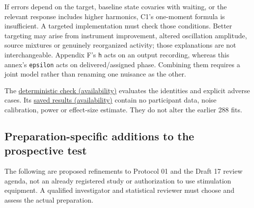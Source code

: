 \documentclass[
  american,
  11pt,
  letterpaper,
]{article}
\begin{document}
If errors depend on the target, baseline state covaries with waiting, or the relevant response includes higher harmonics, C1's one-moment formula is insufficient. A targeted implementation must check those conditions. Better targeting may arise from instrument improvement, altered oscillation amplitude, source mixtures or genuinely reorganized activity; those explanations are not interchangeable. Appendix F's \texttt{h} acts on an output recording, whereas this annex's \texttt{epsilon} acts on delivered/assigned phase. Combining them requires a joint model rather than renaming one nuisance as the other.

The \href{https://github.com/v5ma/v5ma.github.io/blob/master/papers/companions/learning-to-feel-v1.0/ARTIFACT-AVAILABILITY.md\#artifact-25}{deterministic check (availability)} evaluates the identities and explicit adverse cases. Its \href{https://github.com/v5ma/v5ma.github.io/blob/master/papers/companions/learning-to-feel-v1.0/ARTIFACT-AVAILABILITY.md\#artifact-26}{saved results (availability)} contain no participant data, noise calibration, power or effect-size estimate. They do not alter the earlier 288 fits.

\subsection{Preparation-specific additions to the prospective test}\label{preparation-specific-additions-to-the-prospective-test}

The following are proposed refinements to Protocol 01 and the Draft 17 review agenda, not an already registered study or authorization to use stimulation equipment. A qualified investigator and statistical reviewer must choose and assess the actual preparation.
\end{document}
